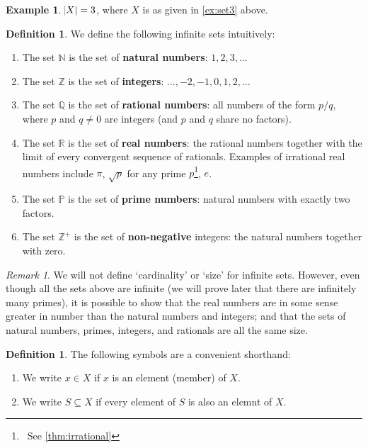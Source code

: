 \documentclass[a4paper, 10pt]{amsart}
\theoremstyle{definition}
\newtheorem{defn}[thm]{Definition}
\newtheorem{ex}[thm]{Example}
\theoremstyle{remark}
\newtheorem{rem}[thm]{Remark}
\begin{document}
\begin{ex}
  $ \abs{X} = 3 $, where $ X $ is as given in \cref{ex:set3} above.
\end{ex}

\begin{defn}
  We define the following infinite sets intuitively:
  \begin{enumerate}
    \item The set $ \mathbb{N} $ is the set of \textbf{natural numbers}: $ 1, 2, 3, ... $
    \item The set $ \mathbb{Z} $ is the set of \textbf{integers}: $ ..., -2, -1, 0, 1, 2, ... $
    \item The set $ \mathbb{Q} $ is the set of \textbf{rational numbers}: all numbers of the form $ p/q $, where $ p $ and $ q \neq 0 $ are
          integers (and $ p $ and $ q $ share no factors).
    \item The set $ \mathbb{R} $ is the set of \textbf{real numbers}: the rational numbers together with the limit of every convergent
          sequence of rationals. Examples of irrational real numbers include $ \pi $, $ \sqrt{p} $ for any
          prime $ p $\footnote{~See \cref{thm:irrational}}, $ e $.
    \item The set $ \mathbb{P} $ is the set of \textbf{prime numbers}: natural numbers with exactly two factors.
    \item The set $ \mathbb{Z}^+ $ is the set of \textbf{non-negative} integers: the natural numbers together with zero.
  \end{enumerate}
\end{defn}

\begin{rem}
  We will not define `cardinality' or `size' for infinite sets. However, even though all the sets above are infinite (we will prove
  later that there are infinitely many primes), it is possible to show that the real numbers are in some sense greater in number
  than the natural numbers and integers; and that the sets of natural numbers, primes, integers, and rationals are all the same size.
\end{rem}

\begin{defn}
  The following symbols are a convenient shorthand:

  \begin{enumerate}
    \item We write $ x \in X $ if $ x $ is an element (member) of $ X $.
    \item We write $ S \subseteq X $ if every element of $ S $ is also an elemnt of $ X $.
  \end{enumerate}
\end{defn}
\end{document}

